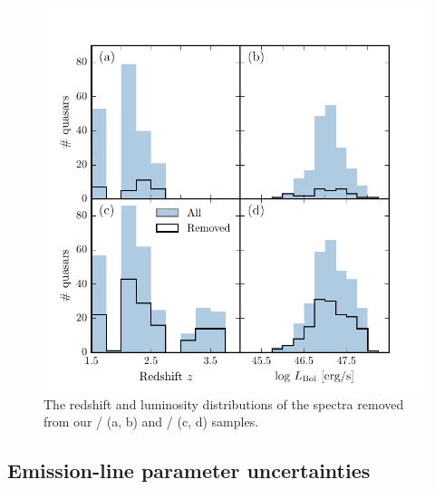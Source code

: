 \begin{figure}
    \includegraphics[width=\textwidth]{figures/chapter03/flagged_spectra.pdf} 
    \caption{The redshift and luminosity distributions of the spectra removed from our \hans/ (a, b) and \hbns/ (c, d) samples.} 
    \label{fig:flagged_spectra}
\end{figure}

\subsection{Emission-line parameter uncertainties}

